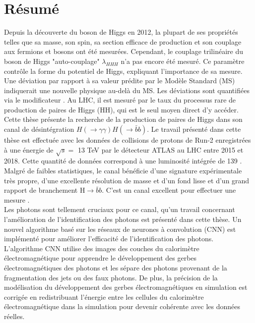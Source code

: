 \newpage
 \chapter*{Résumé}
 

Depuis la découverte du boson de Higgs en 2012, la plupart de ses propriétés telles que sa masse, son spin, sa section efficace de production et son couplage aux fermions et bosons ont été mesurées. Cependant, le couplage trilinéaire du boson de Higgs "auto-couplage" $\lambda_{HHH}$ n'a pas encore été mesuré. Ce paramètre contrôle la forme du potentiel de Higgs, expliquant l'importance de sa mesure. Une déviation par rapport à sa valeur prédite par le Modèle Standard (MS) indiquerait une nouvelle physique au-delà du MS. Les déviations sont quantifiées via le modificateur \kl. Au LHC, il est mesuré par le taux du processus rare de production de paires de Higgs (HH), qui est le seul moyen direct d'y accéder. Cette thèse présente la recherche de la production de paires de Higgs dans son canal de désintégration $H(\to\gamma\gamma)H(\to\bar{b}b)$. Le travail présenté dans cette thèse est effectuée avec les données de collisions de protons de Run-2 enregistrées à une énergie de $\sqrt{s} = $ 13 TeV par le détecteur ATLAS au LHC entre 2015 et 2018. Cette quantité de données correspond à une luminosité intégrée de 139 \ifb. Malgré de faibles statistiques, le canal \bbyy bénéficie d'une signature expérimentale très propre, d'une excellente résolution de masse \myy et d'un fond lisse et d'un grand rapport de branchement H$\to\bar{b}b$. C'est un canal excellent pour effectuer une mesure \kl. \\
Les photons sont tellement cruciaux pour ce canal, qu'un travail concernant l'amélioration de l'identification des photons est présenté dans cette thèse. Un nouvel algorithme basé sur les réseaux de neurones à convolution (CNN) est implémenté pour améliorer l'efficacité de l'identification des photons. L'algorithme CNN utilise des images des couches du calorimètre électromagnétique pour apprendre le développement des gerbes électromagnétiques des photons et les sépare des photons provenant de la fragmentation des jets ou des faux photons. De plus, la précision de la modélisation du développement des gerbes électromagnétiques en simulation est corrigée en redistribuant l'énergie entre les cellules du calorimètre électromagnétique dans la simulation pour devenir cohérente avec les données réelles. \\
